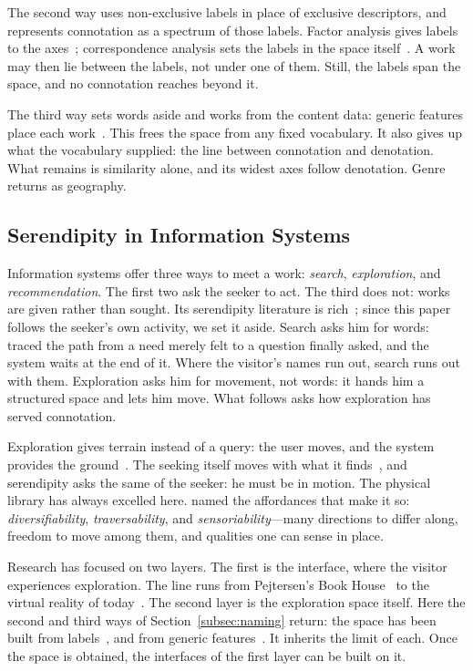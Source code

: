 The second way uses non-exclusive labels in place of exclusive descriptors, and
represents connotation as a spectrum of those labels. Factor analysis gives
labels to the axes~\citep{Osgood1957}; correspondence analysis sets the labels
in the space itself~\citep{Andjelkovic2019142}. A work may then lie between the
labels, not under one of them. Still, the labels span the space, and no
connotation reaches beyond it.

The third way sets words aside and works from the content data: generic features
place each work~\citep{Pampalk2002570,Knees2020165}. This frees the space from
any fixed vocabulary. It also gives up what the vocabulary supplied: the line
between connotation and denotation. What remains is similarity alone, and its
widest axes follow denotation. Genre returns as geography.

\subsection{Serendipity in Information Systems}\label{subsec:systems}

Information systems offer three ways to meet a work: \textit{search},
\textit{exploration}, and \textit{recommendation}. The first two ask the seeker
to act. The third does not: works are given rather than sought. Its serendipity
literature is rich~\citep{Kotkov2016180,Ziarani2021375}; since this paper
follows the seeker's own activity, we set it aside. Search asks him for words:
\citet{Taylor1968178} traced the path from a need merely felt to a question
finally asked, and the system waits at the end of it. Where the visitor's names
run out, search runs out with them. Exploration asks him for movement, not
words: it hands him a structured space and lets him move. What follows asks how
exploration has served connotation.

Exploration gives terrain instead of a query: the user moves, and the system
provides the ground~\citep{Marchionini200641}.
The seeking itself moves with what it finds~\citep{Bates1989407}, and
serendipity asks the same of the seeker: he must be in motion. The physical
library has always excelled here. \citet{Bjorneborn20171053} named the
affordances that make it so: \emph{diversifiability},
\emph{traversability}, and \emph{sensoriability}---many directions to differ
along, freedom to move among them, and qualities one can sense in place.

Research has focused on two layers. The first is the interface, where the
visitor experiences exploration. The line runs from Pejtersen's Book
House~\citeyearpar{Pejtersen198940} to the virtual reality of
today~\citep{Lemos201930}. The second layer is the exploration space itself.
Here the second and third ways of Section~\ref{subsec:naming} return: the space
has been built from labels~\citep{Oliveira2011105,Andjelkovic2019142}, and from
generic features~\citep{Pampalk2002570,Knees2020165}. It inherits the limit of
each. Once the space is obtained, the interfaces of the first layer can be built
on it.


